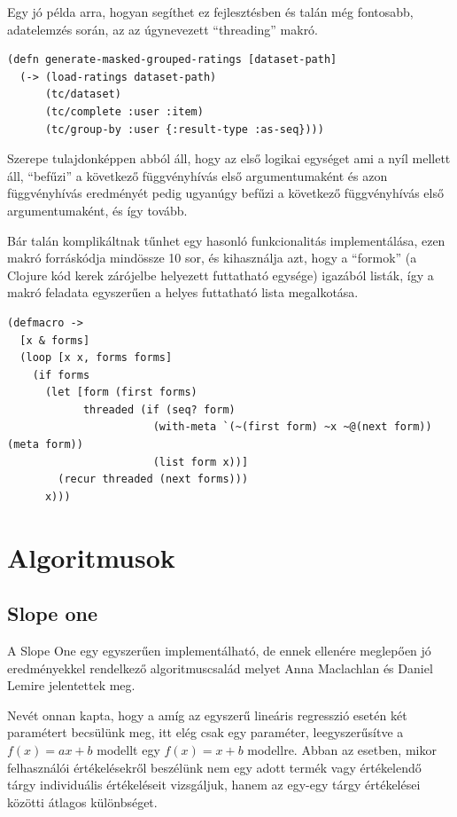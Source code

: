 \documentclass[final, 12pt] {ubb_dolgozat}{book}
\begin{document}
Egy jó példa arra, hogyan segíthet ez fejlesztésben és talán még fontosabb, adatelemzés során, az az úgynevezett ``threading'' makró.

\begin{verbatim}
(defn generate-masked-grouped-ratings [dataset-path]
  (-> (load-ratings dataset-path)
      (tc/dataset)
      (tc/complete :user :item)
      (tc/group-by :user {:result-type :as-seq})))
\end{verbatim}

Szerepe tulajdonképpen abból áll, hogy az első logikai egységet ami a nyíl mellett áll, ``befűzi'' a következő függvényhívás
első argumentumaként és azon függvényhívás eredményét pedig ugyanúgy befűzi a következő függvényhívás első argumentumaként, és így tovább.

Bár talán komplikáltnak tűnhet egy hasonló funkcionalitás implementálása, ezen makró forráskódja mindössze 10 sor, és
kihasználja azt, hogy a ``formok'' (a Clojure kód kerek zárójelbe helyezett futtatható egysége) igazából listák, így a makró feladata egyszerűen a helyes futtatható lista megalkotása.

\begin{verbatim}
(defmacro ->
  [x & forms]
  (loop [x x, forms forms]
    (if forms
      (let [form (first forms)
            threaded (if (seq? form)
                       (with-meta `(~(first form) ~x ~@(next form)) (meta form))
                       (list form x))]
        (recur threaded (next forms)))
      x)))
\end{verbatim}

\chapter{Algoritmusok}
\label{sec:org4a9fcba}
\section{Slope one}
\label{sec:orgd9d99eb}
A Slope One egy egyszerűen implementálható, de ennek ellenére meglepően jó eredményekkel
rendelkező algoritmuscsalád melyet Anna Maclachlan és Daniel Lemire jelentettek meg.
\citep{lemireSlopeOnePredictors2008}

Nevét onnan kapta, hogy a amíg az egyszerű lineáris regresszió esetén két paramétert becsülünk meg,
itt elég csak egy paraméter, leegyszerűsítve a \(f(x) = ax + b\) modellt egy \(f(x) = x + b\) modellre. Abban az esetben, mikor
felhasználói értékelésekről beszélünk nem egy adott termék vagy értékelendő tárgy individuális értékeléseit vizsgáljuk,
hanem az egy-egy tárgy értékelései közötti átlagos különbséget.
\end{document}

